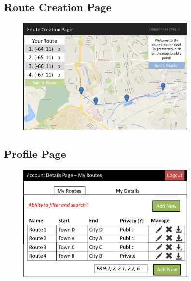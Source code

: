 \subsection{Route Creation Page}
\begin{figure}[!ht]
    \begin{center}
        \includegraphics[width=0.8\textwidth]{images/appendix/rcp1.png}
    \end{center}
    \vspace{-6mm}
\end{figure}

\subsection{Profile Page}
\begin{figure}[!ht]
    \begin{center}
        \includegraphics[width=0.8\textwidth]{images/appendix/prof1.png}
    \end{center}
    \vspace{-6mm}
\end{figure}
